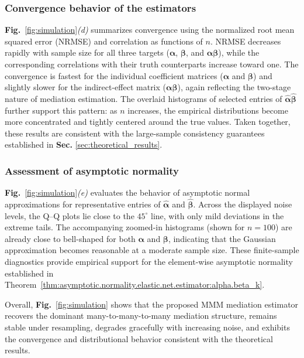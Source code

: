 \documentclass[
  12pt]{article}
\begin{document}
\subsubsection{Convergence behavior of the estimators}
\textbf{Fig.}~\ref{fig:simulation}\textit{(d)} summarizes convergence using the normalized root mean squared error (NRMSE) and correlation as functions of $n$.
NRMSE decreases rapidly with sample size for all three targets ($\bm{\alpha}$, $\bm{\beta}$, and $\bm{\alpha}\bm{\beta}$), while the corresponding correlations with their  truth counterparts increase toward one.
The convergence is fastest for the individual coefficient matrices ($\bm{\alpha}$ and $\bm{\beta}$) and slightly slower for the indirect-effect matrix ($\bm{\alpha}\bm{\beta}$), again reflecting the two-stage nature of mediation estimation.
The overlaid histograms of selected entries of $\widehat{\bm{\alpha}}\widehat{\bm{\beta}}$ further support this pattern: as $n$ increases, the empirical distributions become more concentrated and tightly centered around the true values.
Taken together, these results are consistent with the large-sample consistency guarantees established in \textbf{Sec.} \ref{sec:theoretical_results}.


\subsubsection{Assessment of asymptotic normality}
\textbf{Fig.}~\ref{fig:simulation}\textit{(e)} evaluates the behavior of asymptotic normal approximations for representative entries of $\widehat{\bm{\alpha}}$ and $\widehat{\bm{\beta}}$.
Across the displayed noise levels, the Q--Q plots lie close to the $45^\circ$ line, with only mild deviations in the extreme tails.
The accompanying zoomed-in histograms (shown for $n=100$) are already close to bell-shaped for both $\bm{\alpha}$ and $\bm{\beta}$, indicating that the Gaussian approximation becomes reasonable at a moderate sample size.
These finite-sample diagnostics provide empirical support for the element-wise asymptotic normality established in Theorem~\ref{thm:asymptotic.normality.elastic.net.estimator:alpha.beta_k}.

Overall, \textbf{Fig.}~\ref{fig:simulation} shows that the proposed MMM mediation estimator recovers the dominant many-to-many-to-many mediation structure, remains stable under resampling, degrades gracefully with increasing noise, and exhibits the convergence and distributional behavior consistent with the theoretical results.
\end{document}

